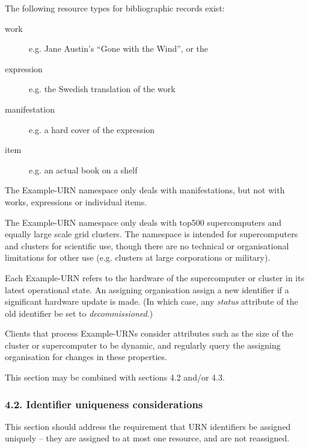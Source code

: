 \documentclass[12pt]{article}  %
\begin{document}
\begin{example}
The following resource types for bibliographic records exist:
\begin{description}
    \item [work] e.g. Jane Austin's “Gone with the Wind”, or the 
    \item [expression] e.g. the Swedish translation of the work
    \item [manifestation] e.g. a hard cover of the expression
    \item [item] e.g. an actual book on a shelf
\end{description}
The Example-URN namespace only deals with manifestations, but not with works, expressions or individual items.
\end{example}



\begin{example}
The Example-URN namespace only deals with top500 supercomputers and equally 
large scale grid clusters. The namespace is intended for supercomputers 
and clusters for scientific use, though there are 
no technical or organisational limitations for other use 
(e.g. clusters at large corporations or military).

Each Example-URN refers to the hardware of the supercomputer 
or cluster in its latest operational state. An assigning organisation 
\MAY{} assign a new identifier if a significant hardware update is made. 
(In which case, any \emph{status} attribute of the old identifier \SHOULD{} 
be set to \emph{decommissioned}.)

Clients that process Example-URNs \SHOULD{} consider attributes such 
as the size of the cluster or supercomputer to be dynamic, and \SHOULD{} 
regularly query the assigning organisation for changes in these properties.
\end{example}

This section may be combined with sections 4.2 and/or 4.3.

\subsubsection*{4.2. Identifier uniqueness considerations}

This section should address the requirement that URN identifiers be assigned 
uniquely -- they are assigned to at most one resource, and are not reassigned.
\end{document}
